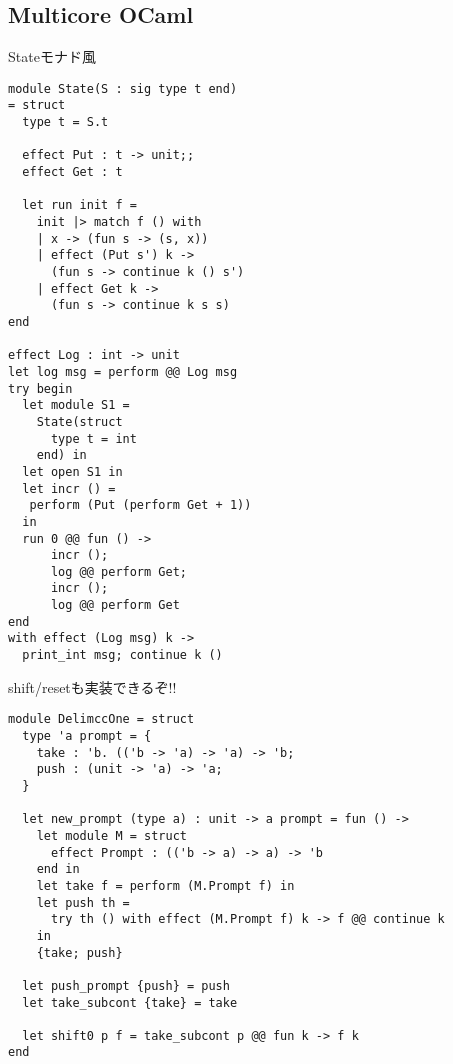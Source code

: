 \subsection{Multicore OCaml}
\begin{frame}[fragile]
    \frametitlesubs

    {\small Stateモナド風}

    \begin{lstlisting}[basicstyle=\scriptsize\ttfamily\color{green!60!black},multicols=2]
module State(S : sig type t end)
= struct
  type t = S.t

  effect Put : t -> unit;;
  effect Get : t

  let run init f =
    init |> match f () with
    | x -> (fun s -> (s, x))
    | effect (Put s') k ->
      (fun s -> continue k () s')
    | effect Get k ->
      (fun s -> continue k s s)
end

effect Log : int -> unit
let log msg = perform @@ Log msg
try begin
  let module S1 =
    State(struct
      type t = int
    end) in
  let open S1 in
  let incr () = 
   perform (Put (perform Get + 1))
  in
  run 0 @@ fun () ->
      incr ();
      log @@ perform Get;
      incr ();
      log @@ perform Get
end
with effect (Log msg) k ->
  print_int msg; continue k ()
    \end{lstlisting}

    \vfill
\end{frame}

\hypertarget{fr:delimcc}{}
\label{fr:deimcc}
\begin{frame}[fragile]
    \frametitlesubs

    shift/resetも実装できるぞ!!
    \begin{lstlisting}[basicstyle=\scriptsize\ttfamily\color{green!60!black}]
module DelimccOne = struct
  type 'a prompt = {
    take : 'b. (('b -> 'a) -> 'a) -> 'b;
    push : (unit -> 'a) -> 'a;
  }

  let new_prompt (type a) : unit -> a prompt = fun () ->
    let module M = struct
      effect Prompt : (('b -> a) -> a) -> 'b
    end in
    let take f = perform (M.Prompt f) in
    let push th =
      try th () with effect (M.Prompt f) k -> f @@ continue k
    in
    {take; push}

  let push_prompt {push} = push
  let take_subcont {take} = take

  let shift0 p f = take_subcont p @@ fun k -> f k
end
    \end{lstlisting}
\end{frame}

